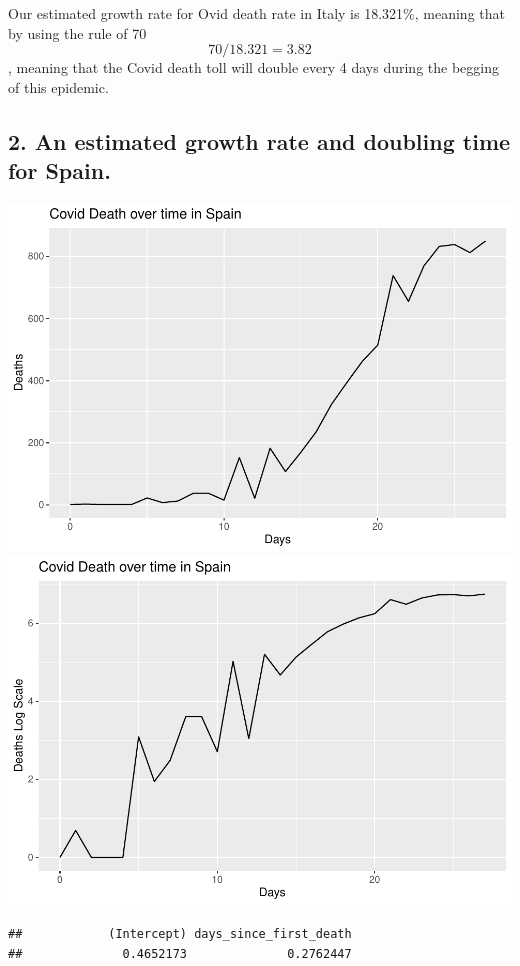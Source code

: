 \documentclass[
]{article}
\begin{document}
Our estimated growth rate for Ovid death rate in Italy is 18.321\%,
meaning that by using the rule of 70 \[ 70/18.321 = 3.82\], meaning that
the Covid death toll will double every 4 days during the begging of this
epidemic.

\hypertarget{an-estimated-growth-rate-and-doubling-time-for-spain.}{%
\subsection{2. An estimated growth rate and doubling time for
Spain.}\label{an-estimated-growth-rate-and-doubling-time-for-spain.}}

\includegraphics{HW3_files/figure-latex/unnamed-chunk-7-1.pdf}
\includegraphics{HW3_files/figure-latex/unnamed-chunk-7-2.pdf}

\begin{verbatim}
##            (Intercept) days_since_first_death 
##              0.4652173              0.2762447
\end{verbatim}
\end{document}
